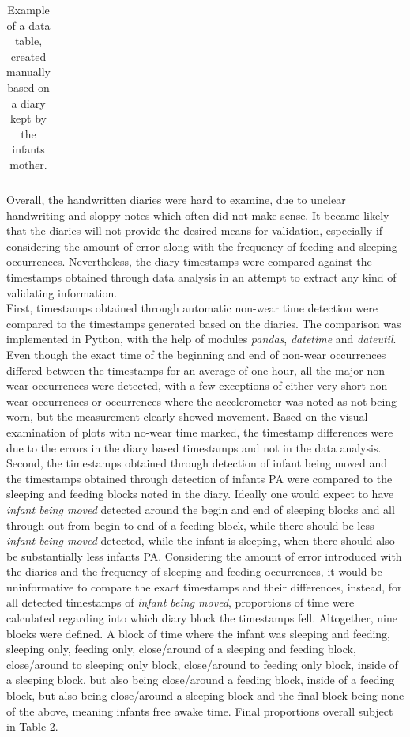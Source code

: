 \documentclass{article}
\begin{document}
{\begin{table}[h]
\begin{tabular}{|l|l|l|l|l|l|}
\end{tabular}
\caption{Example of a data table, created manually based on a diary kept by the infants mother.}
\end{table}
Overall, the handwritten diaries were hard to examine, due to unclear handwriting and sloppy notes which often did not make sense. It became likely that the diaries will not provide the desired means for validation, especially if considering the amount of error along with the frequency of feeding and sleeping occurrences. Nevertheless, the diary timestamps were compared against the timestamps obtained through data analysis in an attempt to extract any kind of validating information. \\
First, timestamps obtained through automatic non-wear time detection were compared to the timestamps generated based on the diaries. The comparison was implemented in Python, with the help of modules \textit{pandas}, \textit{datetime} and \textit{dateutil}. Even though the exact time of the beginning and end of non-wear occurrences differed between the timestamps for an average of one hour, all the major non-wear occurrences were detected, with a few exceptions of either very short non-wear occurrences or occurrences where the accelerometer was noted as not being worn, but the measurement clearly showed movement. Based on the visual examination of plots with no-wear time marked, the timestamp differences were due to the errors in the diary based timestamps and not in the data analysis.
Second, the timestamps obtained through detection of infant being moved and the timestamps obtained through detection of infants PA were compared to the sleeping and feeding blocks noted in the diary. Ideally one would expect to have \textit{infant being moved} detected around the begin and end of sleeping blocks and all through out from begin to end of a feeding block, while there should be less \textit{infant being moved} detected, while the infant is sleeping, when there should also be substantially less infants PA. Considering the amount of error introduced with the diaries and the frequency of sleeping and feeding occurrences, it would be uninformative to compare the exact timestamps and their differences, instead, for all detected timestamps of \textit{infant being moved}, proportions of time were calculated regarding into which diary block the timestamps fell. Altogether, nine blocks were defined. A block of time where the infant was sleeping and feeding, sleeping only, feeding only, close/around of a sleeping and feeding block, close/around to sleeping only block, close/around to feeding only block, inside of a sleeping block, but also being close/around a feeding block, inside of a feeding block, but also being close/around a sleeping block and the final block being none of the above, meaning infants free awake time. Final proportions overall subject in Table 2.
}
\end{document}
